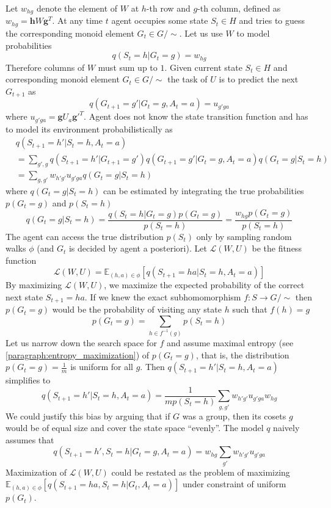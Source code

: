 \documentclass[oneside,english,logo]{amuthesis}
\begin{document}
Let $w_{hg}$ denote the element of $W$ at $h$-th row and $g$-th column, defined as $w_{hg}=\boldsymbol{h}W\boldsymbol{g}^T$. At any time $t$ agent occupies some state $S_t\in H$ and tries to guess the corresponding monoid element $G_t \in G/{\sim}$.
Let us use $W$ to model probabilities \[
q(S_t{=}h|G_t{=}g)=w_{hg}
\]
Therefore columns of $W$ must sum up to $1$.
Given current state $S_t\in H$ and corresponding monoid element $G_t \in G/{\sim}$ the task of $U$ is to predict the next $G_{t+1}$ as
\[
q(G_{t+1}{=}g'|G_t{=}g,A_t{=}a) = u_{g'ga}
\] 
where $u_{g'ga}=\boldsymbol{g} U_{a} \boldsymbol{g'}^T$.
Agent does not know the state transition function and has to  model its environment probabilistically as
\begin{align*}
& q(S_{t+1}{=}h'|S_t{=}h, A_t{=}a) \\
&=\sum_{g',g}  q(S_{t+1}{=}h'|G_{t+1}{=}g') q(G_{t+1}{=}g'|G_t{=}g,A_t{=}a)q(G_t{=}g|S_t{=}h)	\\
&= \sum_{g,g'}w_{h'g'}u_{g'ga}q(G_t{=}g|S_t{=}h)
\end{align*}
where $q(G_t{=}g|S_t{=}h)$ can be estimated by integrating the true probabilities $p(G_t{=}g)$ and $p(S_t{=}h)$ 
\[
q(G_t{=}g|S_t{=}h) = \frac{q(S_t{=}h|G_t{=}g)p(G_t{=}g)}{p(S_t{=}h)} = \frac{w_{hg}p(G_t{=}g)}{p(S_t{=}h)}
\]
The agent can access the true distribution $p(S_t)$ only by sampling random walks $\phi$ (and $G_t$ is decided by agent a posteriori). 
Let $\mathcal{L}(W,U)$ be the fitness function
\[
\mathcal{L}(W,U) = \mathbb{E}_{(h,a)\in\phi}[q(S_{t+1}{=}ha|S_t{=}h, A_t{=}a)]
\]
By maximizing $\mathcal{L}(W,U)$, we maximize the expected probability of the correct next state $S_{t+1}=ha$. If we knew the exact subhomomorphism $f:S\rightarrow G/{\sim}$ then $p(G_t{=}g)$ would be the probability of visiting any state $h$ such that $f(h)=g$
\[
p(G_t{=}g)=\sum_{h\in f^{-1}(g)}p(S_t{=}h)
\]
Let us narrow down the search space for $f$ and assume maximal entropy (see \ref{paragraph:entropy_maximization}) of $p(G_t{=}g)$, that is, the distribution $p(G_t{=}g)=\frac{1}{m}$ is uniform for all $g$. Then $q(S_{t+1}{=}h'|S_t{=}h, A_t{=}a)$ simplifies to
\[
q(S_{t+1}{=}h'|S_t{=}h, A_t{=}a)=\frac{1}{mp(S_t{=}h)}\sum_{g,g'}w_{h'g'}u_{g'ga}w_{hg}
\]
We could justify this bias by arguing that if $G$ was a group, then its cosets $g$ would be of equal size and cover the state space ``evenly''. The model $q$ naively assumes that
\[
q(S_{t+1}{=}h',S_t{=}h|G_t{=}g,A_t{=}a)=w_{hg} \sum_{g'}w_{h'g'}u_{g'ga}
\]
Maximization of $\mathcal{L}(W,U)$ could be restated as the problem of maximizing $\mathbb{E}_{(h,a)\in\phi}[q(S_{t+1}{=}ha,S_t{=}h|G_t,A_t{=}a)]$ under constraint of uniform $p(G_t)$.
\end{document}
